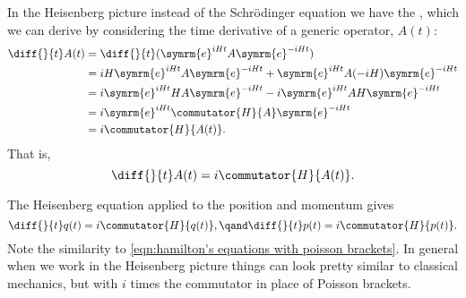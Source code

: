 \documentclass[fleqn]{NotesClass}
\newcommand{\e}{\symrm{e}}
\begin{document}
    In the Heisenberg picture instead of the Schrödinger equation we have the , which we can derive by considering the time derivative of a generic operator, \(A(t)\):
    \begin{align}
        \diff{}{t}A(t) &= \diff{}{t}(\e^{iHt}A\e^{-iHt})\\
        &= iH\e^{iHt}A\e^{-iHt} + \e^{iHt}A(-iH)\e^{-iHt}\\
        &= i\e^{iHt}HA\e^{-iHt} - i\e^{iHt}AH\e^{-iHt}\\
        &= i\e^{iHt}\commutator{H}{A}\e^{-iHt}\\
        &= i\commutator{H}{A(t)}.
    \end{align}
    That is,
    \begin{equation}
        \diff{}{t}A(t) = i\commutator{H}{A(t)}.
    \end{equation}
    
    The Heisenberg equation applied to the position and momentum gives
    \begin{equation}
        \diff{}{t}q(t) = i\commutator{H}{q(t)}, \qand \diff{}{t}p(t) = i\commutator{H}{p(t)}.
    \end{equation}
    Note the similarity to \cref{eqn:hamilton's equations with poisson brackets}.
    In general when we work in the Heisenberg picture things can look pretty similar to classical mechanics, but with \(i\) times the commutator in place of Poisson brackets.
    
\end{document}
